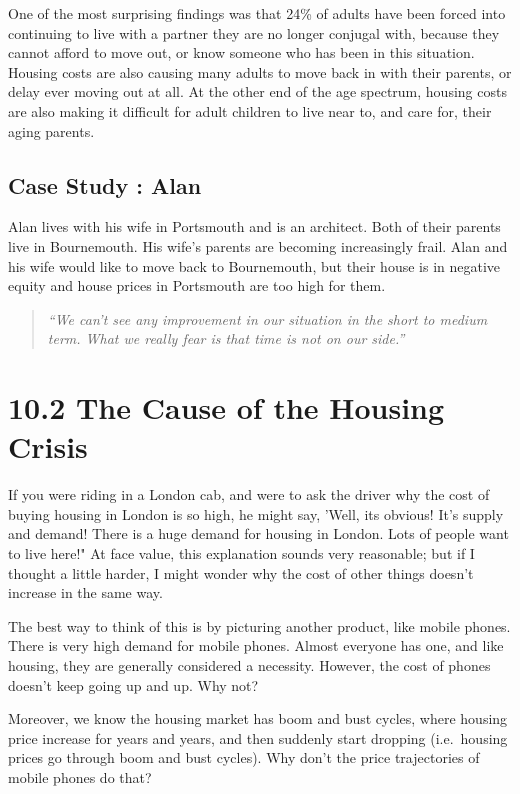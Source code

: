 \documentclass[]{tufte-handout}
\begin{document}
One of the most surprising findings was that 24\% of adults have been
forced into continuing to live with a partner they are no longer
conjugal with, because they cannot afford to move out, or know someone
who has been in this situation. Housing costs are also causing many
adults to move back in with their parents, or delay ever moving out at
all. At the other end of the age spectrum, housing costs are also making
it difficult for adult children to live near to, and care for, their
aging parents.

\hypertarget{case-study-alan}{%
\subsection{Case Study : Alan}\label{case-study-alan}}

Alan lives with his wife in Portsmouth and is an architect. Both of
their parents live in Bournemouth. His wife's parents are becoming
increasingly frail. Alan and his wife would like to move back to
Bournemouth, but their house is in negative equity and house prices in
Portsmouth are too high for them.

\begin{quote}
\emph{``We can't see any improvement in our situation in the short to
medium term. What we really fear is that time is not on our side.''}
\end{quote}

\hypertarget{the-cause-of-the-housing-crisis}{%
\section{10.2 The Cause of the Housing
Crisis}\label{the-cause-of-the-housing-crisis}}

If you were riding in a London cab, and were to ask the driver why the
cost of buying housing in London is so high, he might say, 'Well, its
obvious! It's supply and demand! There is a huge demand for housing in
London. Lots of people want to live here!" At face value, this
explanation sounds very reasonable; but if I thought a little harder, I
might wonder why the cost of other things doesn't increase in the same
way.

The best way to think of this is by picturing another product, like
mobile phones. There is very high demand for mobile phones. Almost
everyone has one, and like housing, they are generally considered a
necessity. However, the cost of phones doesn't keep going up and up. Why
not?

Moreover, we know the housing market has boom and bust cycles, where
housing price increase for years and years, and then suddenly start
dropping (i.e.~housing prices go through boom and bust cycles). Why
don't the price trajectories of mobile phones do that?
\end{document}
